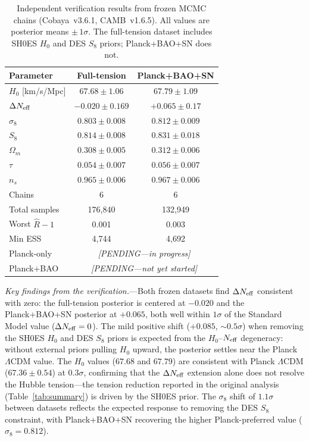 \documentclass[aps,prd,twocolumn,superscriptaddress,showpacs,preprintnumbers,nofootinbib,longbibliography,floatfix]{revtex4-2}
\newcommand{\Neff}{N_{\rm eff}}
\begin{document}
\begin{table}[h]
\caption{\label{tab:verification} Independent verification results from frozen MCMC chains (Cobaya~v3.6.1, CAMB~v1.6.5). All values are posterior means $\pm\,1\sigma$. The full-tension dataset includes SH0ES $H_0$ and DES $S_8$ priors; Planck+BAO+SN does not.}
\begin{ruledtabular}
\begin{tabular}{lcc}
Parameter & Full-tension & Planck+BAO+SN \\
\hline
$H_0$ [km/s/Mpc] & $67.68 \pm 1.06$ & $67.79 \pm 1.09$ \\
$\Delta\Neff$ & $-0.020 \pm 0.169$ & $+0.065 \pm 0.17$ \\
$\sigma_8$ & $0.803 \pm 0.008$ & $0.812 \pm 0.009$ \\
$S_8$ & $0.814 \pm 0.008$ & $0.831 \pm 0.018$ \\
$\Omega_m$ & $0.308 \pm 0.005$ & $0.312 \pm 0.006$ \\
$\tau$ & $0.054 \pm 0.007$ & $0.056 \pm 0.007$ \\
$n_s$ & $0.965 \pm 0.006$ & $0.967 \pm 0.006$ \\
\hline
Chains & 6 & 6 \\
Total samples & 176{,}840 & 132{,}949 \\
Worst $\hat{R}-1$ & 0.001 & 0.003 \\
Min ESS & 4{,}744 & 4{,}692 \\
\hline
Planck-only & \multicolumn{2}{c}{\textit{[PENDING---in progress]}} \\
Planck+BAO & \multicolumn{2}{c}{\textit{[PENDING---not yet started]}} \\
\end{tabular}
\end{ruledtabular}
\end{table}

\textit{Key findings from the verification.}---Both frozen datasets find $\Delta\Neff$ consistent with zero: the full-tension posterior is centered at $-0.020$ and the Planck+BAO+SN posterior at $+0.065$, both well within $1\sigma$ of the Standard Model value ($\Delta\Neff = 0$). The mild positive shift ($+0.085$, ${\sim}0.5\sigma$) when removing the SH0ES $H_0$ and DES $S_8$ priors is expected from the $H_0$--$\Neff$ degeneracy: without external priors pulling $H_0$ upward, the posterior settles near the Planck $\Lambda$CDM value. The $H_0$ values ($67.68$ and $67.79$) are consistent with Planck $\Lambda$CDM ($67.36 \pm 0.54$) at $0.3\sigma$, confirming that the $\Delta\Neff$ extension alone does not resolve the Hubble tension---the tension reduction reported in the original analysis (Table~\ref{tab:summary}) is driven by the SH0ES prior. The $\sigma_8$ shift of $1.1\sigma$ between datasets reflects the expected response to removing the DES $S_8$ constraint, with Planck+BAO+SN recovering the higher Planck-preferred value ($\sigma_8 = 0.812$).
\end{document}
